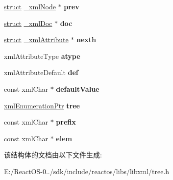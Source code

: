 \begin{DoxyCompactItemize}
\hyperlink{interfacestruct}{struct} \hyperlink{struct__xml_node}{\+\_\+xml\+Node} $\ast$ {\bfseries prev}
\item 
\mbox{\label{struct__xml_attribute_a9cc7df019f9b6bf88a263cddf8224351}} 
\hyperlink{interfacestruct}{struct} \hyperlink{struct__xml_doc}{\+\_\+xml\+Doc} $\ast$ {\bfseries doc}
\item 
\mbox{\label{struct__xml_attribute_ace58b06016a83e78f9030a3a734577ea}} 
\hyperlink{interfacestruct}{struct} \hyperlink{struct__xml_attribute}{\+\_\+xml\+Attribute} $\ast$ {\bfseries nexth}
\item 
\mbox{\label{struct__xml_attribute_ae3a8371d4d1d21b585c5d97895c3d6dd}} 
xml\+Attribute\+Type {\bfseries atype}
\item 
\mbox{\label{struct__xml_attribute_a4e0cc0380fd2d2009bb2853e7c34423b}} 
xml\+Attribute\+Default {\bfseries def}
\item 
\mbox{\label{struct__xml_attribute_a1fd4cc9f458498c327f7fcc8730da01c}} 
const xml\+Char $\ast$ {\bfseries default\+Value}
\item 
\mbox{\label{struct__xml_attribute_a630c42587e233ede3bbbd2c8e29d5108}} 
\hyperlink{struct__xml_enumeration}{xml\+Enumeration\+Ptr} {\bfseries tree}
\item 
\mbox{\label{struct__xml_attribute_a9b97bd921567b53ae625daa4ef849480}} 
const xml\+Char $\ast$ {\bfseries prefix}
\item 
\mbox{\label{struct__xml_attribute_ac7911f56d58e8a476fd0a53bf529cf7e}} 
const xml\+Char $\ast$ {\bfseries elem}
\end{DoxyCompactItemize}


该结构体的文档由以下文件生成\+:\begin{DoxyCompactItemize}
\item 
E\+:/\+React\+O\+S-\/0../sdk/include/reactos/libs/libxml/tree.\+h\end{DoxyCompactItemize}
